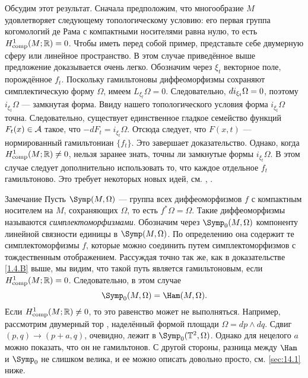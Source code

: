 Обсудим этот результат.
Сначала предположим, что многообразие $M$ удовлетворяет следующему
топологическому условию: его первая группа когомологий де Рама с компактными носителями равна нулю, то есть $H_{\mathrm{comp}}^1(M;\mathbb{R}) = 0$.
Чтобы иметь перед собой пример, представьте себе двумерную сферу или линейное пространство.
В этом случае приведённое выше предложение доказывается очень легко.
Обозначим через $\xi_t$ векторное поле, порождённое $f_t$.
Поскольку гамильтоновы диффеоморфизмы сохраняют симплектическую форму $\Omega$, имеем $L_{\xi_t} \Omega = 0$.
Следовательно, $d i_{\xi_t} \Omega = 0$, поэтому $i_{\xi_t} \Omega$ — замкнутая форма.
Ввиду нашего топологического условия форма $i_{\xi_t} \Omega$ точна.
Следовательно, существует единственное гладкое семейство функций $F_t (x) \in \mathcal{A}$ такое, что $-dF_t = i_{\xi_t} \Omega$.
Отсюда следует, что $F (x, t)$ — нормированный гамильтониан $\{f_t\}$.
Это завершает доказательство.
Однако, когда $H^1_{\mathrm{comp}} (M;\mathbb{R}) \ne 0$, нельзя  заранее знать, точны ли замкнутые формы $i_{\xi_t} \Omega$.
В этом случае следует дополнительно использовать то, что каждое отдельное $f_t$ гамильтоново.
Это требует некоторых новых идей, см. \cite{B1}, \cite{MS}.

\begin{ex}{Замечание}\label{1.4.C}
Пусть $\Symp(M,\Omega)$ — группа всех диффеоморфизмов $f$ с компактным носителем на $M$, сохраняющих $\Omega$, то есть $f^\ast\Omega = \Omega$.
Такие диффеоморфизмы называются \emph{симплектоморфизмами}.
Обозначим через $\Symp_0(M,\Omega)$ компоненту линейной связности единицы в $\Symp(M,\Omega)$.
По определению она содержит те симплектоморфизмы $f$, которые можно соединить путем симплектоморфизмов с тождественным отображением.
Рассуждая точно так же, как в доказательстве \ref{1.4.B} выше, мы видим, что такой путь является гамильтоновым, если $H^1_{\mathrm{comp}} (M;\mathbb{R}) = 0$.
Следовательно, в этом случае
\[\Symp_0 (M, \Omega) = \Ham (M, \Omega).\]
Если $H^1_{\mathrm{comp}} (M;\mathbb{R}) \ne 0$, то это равенство может не выполняться.
Например, рассмотрим двумерный тор , наделённый формой площади $\Omega = dp \wedge dq$.
Сдвиг $(p, q) \to (p + a, q)$, очевидно, лежит в $\Symp_0 (\TT^2, \Omega)$.
Однако для нецелого $a$ можно показать, что он не гамильтонов.
С другой стороны, разница между $\Ham$ и $\Symp_0$ не слишком велика, и ее можно описать довольно просто, см. \ref{sec:14.1} ниже.
\end{ex}

